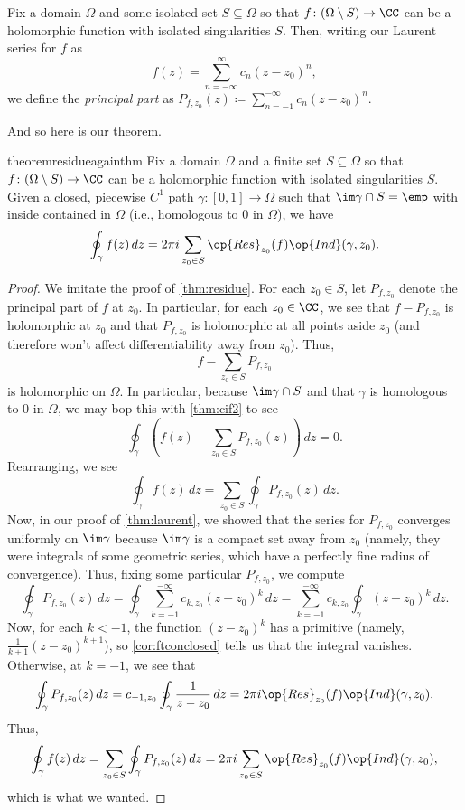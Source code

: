 \begin{definition}[Residue]
	Fix a domain $\Omega$ and some isolated set $S\subseteq\Omega$ so that $f\colon(\Omega\setminus S)\to\CC$ can be a holomorphic function with isolated singularities $S$. Then, writing our Laurent series for $f$ as
	\[f(z)=\sum_{n=-\infty}^\infty c_n(z-z_0)^n,\]
	we define the \textit{principal part} as $P_{f,z_0}(z)\coloneqq \sum_{n=-1}^{-\infty} c_n(z-z_0)^n$.
\end{definition}
And so here is our theorem.
\begin{restatable}[Residue]{theorem}{residueagainthm} \label{thm:residue2}
	Fix a domain $\Omega$ and a finite set $S\subseteq\Omega$ so that $f\colon(\Omega\setminus S)\to\CC$ can be a holomorphic function with isolated singularities $S$. Given a closed, piecewise $C^1$ path $\gamma\colon[0,1]\to\Omega$ such that $\im\gamma\cap S=\emp$ with inside contained in $\Omega$ (i.e., homologous to $0$ in $\Omega$), we have
	\[\oint_\gamma f(z)\,dz=2\pi i\sum_{z_0\in S}\op{Res}_{z_0}(f)\op{Ind}(\gamma,z_0).\]
\end{restatable}
\begin{proof}
	We imitate the proof of \autoref{thm:residue}. For each $z_0\in S$, let $P_{f,z_0}$ denote the principal part of $f$ at $z_0$. In particular, for each $z_0\in\CC$, we see that $f-P_{f,z_0}$ is holomorphic at $z_0$ and that $P_{f,z_0}$ is holomorphic at all points aside $z_0$ (and therefore won't affect differentiability away from $z_0$). Thus,
	\[f-\sum_{z_0\in S}P_{f,z_0}\]
	is holomorphic on $\Omega$. In particular, because $\im\gamma\cap S$ and that $\gamma$ is homologous to $0$ in $\Omega$, we may bop this with \autoref{thm:cif2} to see
	\[\oint_\gamma\left(f(z)-\sum_{z_0\in S}P_{f,z_0}(z)\right)\,dz=0.\]
	Rearranging, we see
	\[\oint_\gamma f(z)\,dz=\sum_{z_0\in S}\oint_\gamma P_{f,z_0}(z)\,dz.\]
	Now, in our proof of \autoref{thm:laurent}, we showed that the series for $P_{f,z_0}$ converges uniformly on $\im\gamma$ because $\im\gamma$ is a compact set away from $z_0$ (namely, they were integrals of some geometric series, which have a perfectly fine radius of convergence). Thus, fixing some particular $P_{f,z_0}$, we compute
	\[\oint_\gamma P_{f,z_0}(z)\,dz = \oint_\gamma\sum_{k=-1}^{-\infty}c_{k,z_0}(z-z_0)^k\,dz = \sum_{k=-1}^{-\infty}c_{k,z_0}\oint_\gamma (z-z_0)^k\,dz.\]
	Now, for each $k<-1$, the function $(z-z_0)^k$ has a primitive (namely, $\frac1{k+1}(z-z_0)^{k+1}$), so \autoref{cor:ftconclosed} tells us that the integral vanishes. Otherwise, at $k=-1$, we see that
	\[\oint_\gamma P_{f,z_0}(z)\,dz = c_{-1,z_0}\oint_\gamma\frac1{z-z_0}\,dz=2\pi i\op{Res}_{z_0}(f)\op{Ind}(\gamma,z_0).\]
	Thus,
	\[\oint_\gamma f(z)\,dz=\sum_{z_0\in S}\oint_\gamma P_{f,z_0}(z)\,dz=2\pi  i\sum_{z_0\in S}\op{Res}_{z_0}(f)\op{Ind}(\gamma,z_0),\]
	which is what we wanted.
\end{proof}

